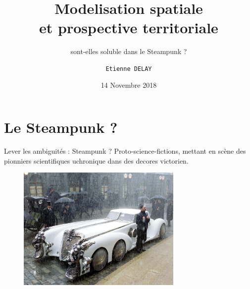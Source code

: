\documentclass[newPxFont]{beamer}
\title{Modelisation spatiale \\et prospective territoriale}
\subtitle{sont-elles soluble dans le Steampunk ?}
\date{14 Novembre 2018}
\author{\texttt{Etienne DELAY}}
\institute{UR GREEN}
\begin{document}
%
%

\maketitle


%
%

\section{Le Steampunk ?}


\begin{frame}[c]{Lever les ambiguités : Steampunk ? }
\vspace{-1cm}
Proto-science-fictions, mettant en scène des pionniers scientifiques uchronique dans des decores victorien.
\begin{figure}
  \includegraphics[height=6cm]{img/a_steampunk_car.jpg}
\end{figure}
\end{frame}
\end{document}
